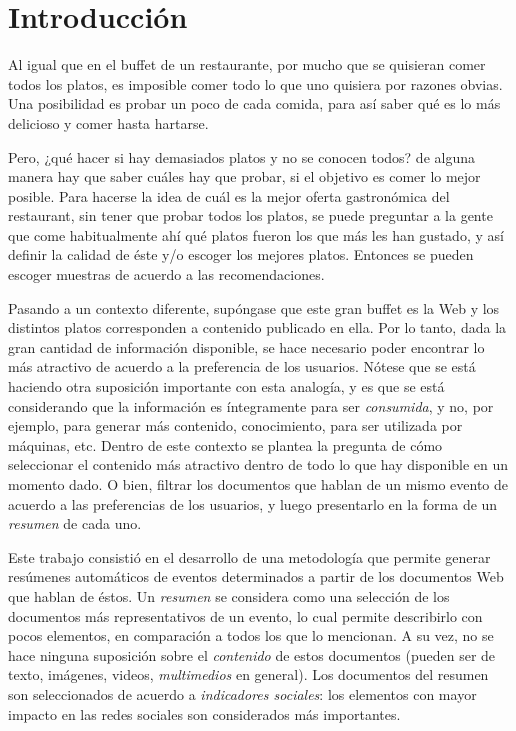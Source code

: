 
\chapter{Introducción}
\label{sec-1}


  Al igual que en el buffet de un restaurante, por mucho que se quisieran
  comer todos los platos, es imposible comer todo lo que uno
  quisiera por razones obvias. Una posibilidad es probar un poco de cada
  comida, para así saber qué es lo más delicioso y comer hasta
  hartarse.

  Pero, ¿qué hacer si hay demasiados platos y no se conocen todos? de
  alguna manera hay que saber cuáles hay que probar, si el objetivo es
  comer lo mejor posible. Para hacerse la idea de cuál 
  es la mejor oferta gastronómica del
  restaurant, sin tener que probar todos los platos, se puede
  preguntar a la gente que come habitualmente ahí qué platos fueron
  los que más les han gustado, y así definir la calidad de éste y/o
  escoger los mejores platos. Entonces se pueden escoger
  muestras de acuerdo a las recomendaciones.

  Pasando a un contexto diferente, supóngase que este gran buffet es la
  Web y los distintos platos corresponden a contenido publicado en
  ella. Por lo tanto, dada la gran cantidad de información disponible,
  se hace necesario poder encontrar lo más atractivo de acuerdo a la
  preferencia de los usuarios. Nótese que se está
  haciendo otra suposición importante con esta analogía, y es que se
  está considerando que la información es íntegramente para ser
  \emph{consumida}, y no, por ejemplo, para generar más contenido,
  conocimiento, para ser utilizada por máquinas, etc. Dentro de
  este contexto se plantea la pregunta de cómo seleccionar el contenido
  más atractivo dentro de todo lo que hay disponible en un momento dado. 
  O bien, filtrar los documentos que hablan de un mismo evento de acuerdo 
  a las preferencias de los usuarios, y luego presentarlo en la forma de 
  un \emph{resumen} de cada uno.

  Este trabajo consistió en el desarrollo de una metodología
  que permite generar resúmenes automáticos de eventos determinados
  a partir de los documentos Web que hablan de éstos. Un \emph{resumen} se
  considera como una selección de los documentos más representativos de un evento,
  lo cual permite describirlo con pocos elementos, en comparación a todos los que
  lo mencionan. A su vez, no se hace ninguna suposición sobre el \emph{contenido} de estos documentos (pueden
  ser de texto, imágenes, videos, \emph{multimedios} en general). Los
  documentos del resumen son seleccionados de acuerdo a
  \emph{indicadores sociales}: los elementos con mayor impacto en las redes
  sociales son considerados más importantes. 


